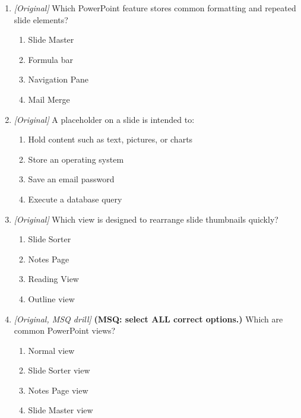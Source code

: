 \begin{enumerate}[label=\textbf{Q\arabic*.}, leftmargin=*]
\item \textit{[Original]} Which PowerPoint feature stores common formatting and repeated slide elements?
  \begin{enumerate}[label=\Alph*.]
\item Slide Master
   \item Formula bar
   \item Navigation Pane
   \item Mail Merge
  \end{enumerate}

\item \textit{[Original]} A placeholder on a slide is intended to:
  \begin{enumerate}[label=\Alph*.]
\item Hold content such as text, pictures, or charts
   \item Store an operating system
   \item Save an email password
   \item Execute a database query
  \end{enumerate}

\item \textit{[Original]} Which view is designed to rearrange slide thumbnails quickly?
  \begin{enumerate}[label=\Alph*.]
\item Slide Sorter
   \item Notes Page
   \item Reading View
   \item Outline view
  \end{enumerate}

\item \textit{[Original, MSQ drill]} \textbf{(MSQ: select ALL correct options.)} Which are common PowerPoint views?
  \begin{enumerate}[label=\Alph*.]
\item Normal view
   \item Slide Sorter view
   \item Notes Page view
   \item Slide Master view
  \end{enumerate}

\end{enumerate}
